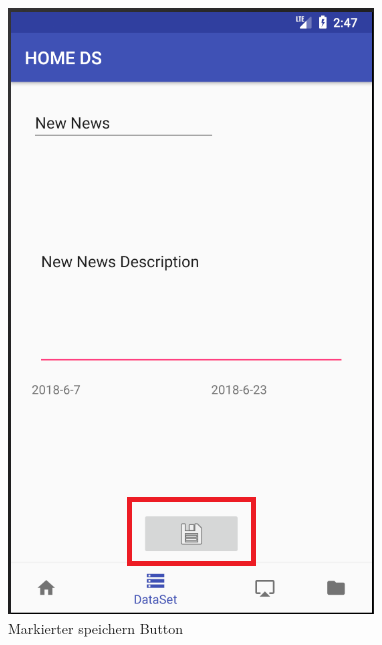\begin{figure}[H]
\centering
\includegraphics[scale=0.35]{images/06_AndroidApp/06_EditNewsSaveButton}
\caption{Markierter speichern Button}
\label{fig:06_EditNewsSaveButton}
\end{figure}

